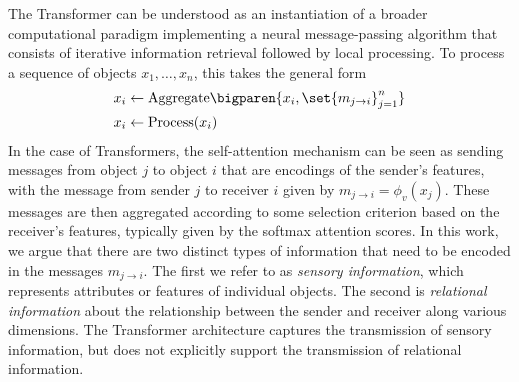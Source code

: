 The Transformer can be understood as an instantiation of a broader computational paradigm implementing a neural message-passing algorithm that consists of iterative information retrieval followed by local processing. To process a sequence of objects $x_1,\ldots, x_n$, this takes the general form
\begin{equation}\label{eq:intro_message_passing}
  \begin{split}
    x_i &\gets \mathrm{Aggregate}\bigparen{x_i, \set{m_{j \to i}}_{j=1}^{n}} \\
    x_i &\gets \mathrm{Process}(x_i)
  \end{split}
\end{equation}
In the case of Transformers, the self-attention mechanism can be seen as sending messages from object $j$ to object $i$ that are encodings of the sender's features, with the message from sender $j$ to receiver $i$ given by $m_{j \to i} = \phi_v(x_j)$. These messages are then aggregated according to some selection criterion based on the receiver's features,  typically given by the softmax attention scores. In this work, we argue that there are two distinct types of information that need to be encoded in the messages $m_{j \to i}$. The first we refer to as \textit{sensory information}, which represents attributes or features of individual objects. The second is \textit{relational information} about the relationship between the sender and receiver along various dimensions.
The Transformer architecture captures the transmission of sensory information, but does not explicitly support the transmission of relational information.



